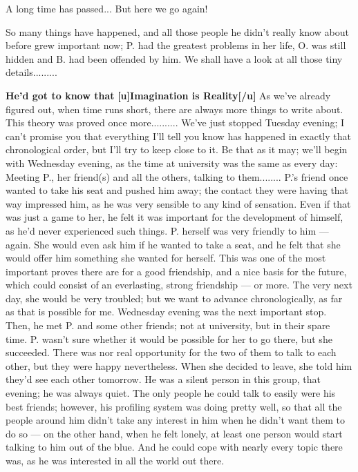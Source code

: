 A long time has passed... But here we go again!

So many things have happened, and all those people he didn't really know about before grew important now; P. had the greatest problems in her life, O. was still hidden and B. had been offended by him. We shall have a look at all those tiny details......... 

\textbf{He'd got to know that}
\textbf{[u]Imagination is Reality[/u]}
As we've already figured out, when time runs short, there are always more things to write about. This theory was proved once more..........
We've just stopped Tuesday evening; I can't promise you that everything I'll tell you know has happened in exactly that chronological order, but I'll try to keep close to it. 
Be that as it may; we'll begin with Wednesday evening, as the time at university was the same as every day: Meeting P., her friend(s) and all the others, talking to them........
P.'s friend once wanted to take his seat and pushed him away; the contact they were having that way impressed him, as he was very sensible to any kind of sensation. Even if that was just a game to her, he felt it was important for the development of himself, as he'd never experienced such things. 
P. herself was very friendly to him --- again. She would even ask him if he wanted to take a seat, and he felt that she would offer him something she wanted for herself. This was one of the most important proves there are for a good friendship, and a nice basis for the future, which could consist of an everlasting, strong friendship --- or more. The very next day, she would be very troubled; but we want to advance chronologically, as far as that is possible for me. 
Wednesday evening was the next important stop. Then, he met P. and some other friends; not at university, but in their spare time. P. wasn't sure whether it would be possible for her to go there, but she succeeded. There was nor real opportunity for the two of them to talk to each other, but they were happy nevertheless. When she decided to leave, she told him they'd see each other tomorrow. 
He was a silent person in this group, that evening; he was always quiet. The only people he could talk to easily were his best friends; however, his profiling system was doing pretty well, so that all the people around him didn't take any interest in him when he didn't want them to do so --- on the other hand, when he felt lonely, at least one person would start talking to him out of the blue. And he could cope with nearly every topic there was, as he was interested in all the world out there. 
